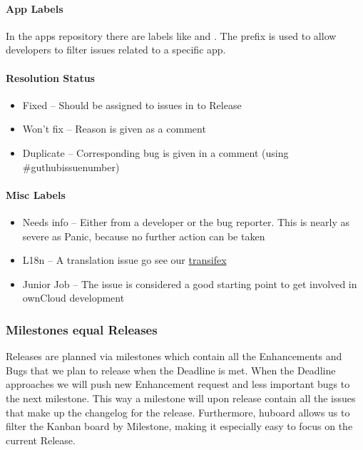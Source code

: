 \documentclass[letterpaper,10pt,english]{sphinxmanual}
\begin{document}
\paragraph{App Labels}
\label{bugtracker/kanban:app-labels}
In the apps repository there are labels like  and
. The  prefix is used to allow developers to filter
issues related to a specific app.


\paragraph{Resolution Status}
\label{bugtracker/kanban:resolution-status}\begin{itemize}
\item {} 
Fixed – Should be assigned to issues in to Release

\item {} 
Won’t fix – Reason is given as a comment

\item {} 
Duplicate – Corresponding bug is given in a comment (using \#guthubissuenumber)

\end{itemize}


\paragraph{Misc Labels}
\label{bugtracker/kanban:misc-labels}\begin{itemize}
\item {} 
Needs info – Either from a developer or the bug reporter. This is nearly as
severe as Panic, because no further action can be taken

\item {} 
L18n – A translation issue go see our \href{https://www.transifex.com/projects/p/owncloud/}{transifex}

\item {} 
Junior Job – The issue is considered a good starting point to get involved in ownCloud development

\end{itemize}


\subsubsection{Milestones equal Releases}
\label{bugtracker/kanban:milestones-equal-releases}
Releases are planned via milestones which contain all the Enhancements and Bugs
that we plan to release when the Deadline is met. When the Deadline approaches
we will push new Enhancement request and less important bugs to the next
milestone. This way a milestone will upon release contain all the issues that
make up the changelog for the release. Furthermore, huboard allows us to filter
the Kanban board by Milestone, making it especially easy to focus on the current
Release.
\end{document}
